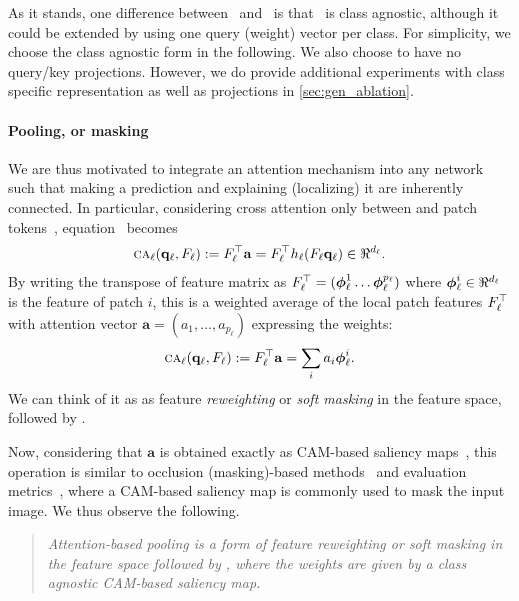 As it stands, one difference between~ and~ is that~ is class agnostic, although it could be extended by using one query (weight) vector per class. For simplicity, we choose the class agnostic form in the following. We also choose to have no query/key projections. However, we do provide additional experiments with class specific representation as well as projections in \autoref{sec:gen_ablation}. 

\paragraph{Pooling, or masking}

We are thus motivated to integrate an attention mechanism into any network such that making a prediction and explaining (localizing) it are inherently connected. In particular, considering cross attention only between \cls and patch tokens~, equation~ becomes
\begin{align}
	\ca_\ell(\vq_\ell, F_\ell) \defn F_\ell\tran \mathbf{a} = F_\ell\tran h_\ell(F_\ell \vq_\ell) \in \real^{d_\ell}.
\label{eq:CA}
\end{align}
By writing the transpose of feature matrix as $F_\ell^\top = ({\boldsymbol{\phi}}_\ell^1 \dots {\boldsymbol{\phi}}_\ell^{p_\ell})$ where $\vphi_\ell^i \in \real^{d_\ell}$ is the feature of patch $i$, this is a weighted average of the local patch features $F_\ell^\top$ with attention vector $\mathbf{a} = (a_1, \dots, a_{p_\ell})$ expressing the weights:
\begin{align}
	{\textsc{ca}}_\ell(\mathbf{q}_\ell, F_\ell) \mathrel{:=} F_\ell^\top \mathbf{a} = \sum_i a_i {\boldsymbol{\phi}}_\ell^i.
\label{eq:CA-gap}
\end{align}
We can think of it as as feature \emph{reweighting} or \emph{soft masking} in the feature space, followed by \gap.

Now, considering that $\mathbf{a}$ is obtained exactly as CAM-based saliency maps~, this operation is similar to occlusion (masking)-based methods~\citep{petsiuk2018rise, fong2017interpretable, fong2019understanding, schulz2020restricting, ribeiro2016should,DBLP:journals/corr/abs-1910-01279, zhang2023opti} and evaluation metrics~\cite{DBLP:journals/corr/abs-1710-11063, petsiuk2018rise}, where a CAM-based saliency map is commonly used to mask the input image. We thus observe the following.

\begin{quote}
	\emph{Attention-based pooling is a form of feature reweighting or soft masking in the feature space followed by \gap, where the weights are given by a class agnostic CAM-based saliency map.}
\end{quote}

%